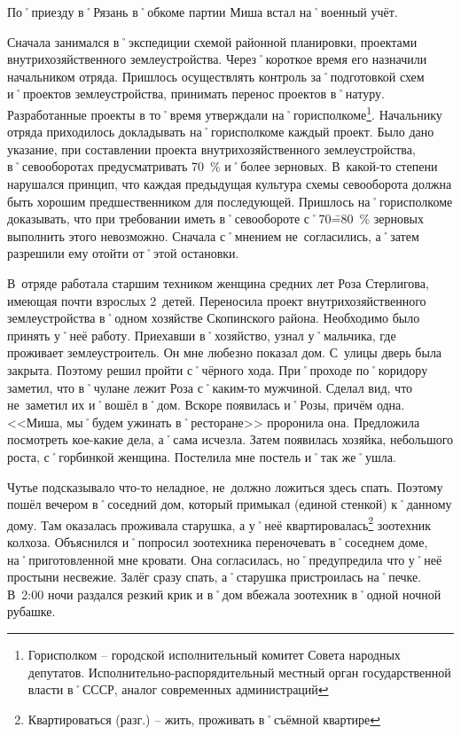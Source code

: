 По˚приезду в˚Рязань в˚обкоме партии Миша встал на˚военный учёт.

Сначала занимался в˚экспедиции схемой районной планировки, проектами внутрихозяйственного землеустройства. Через˚короткое время его назначили начальником отряда. Пришлось осуществлять контроль за˚подготовкой схем и˚проектов землеустройства, принимать перенос проектов в˚натуру. Разработанные проекты в то˚время утверждали на˚горисполкоме\footnote{Горисполком \--- городской исполнительный комитет Совета народных депутатов. Исполнительно-распорядительный местный орган государственной власти в˚СССР, аналог современных администраций}. Начальнику отряда приходилось докладывать на˚горисполкоме каждый проект. Было дано указание, при составлении проекта внутрихозяйственного землеустройства, в˚севооборотах предусматривать 70~\% и˚более зерновых. В~какой-то степени нарушался принцип, что каждая предыдущая культура схемы севооборота должна быть хорошим предшественником для последующей. Пришлось на˚горисполкоме доказывать, что при требовании иметь в˚севообороте с˚70\==80~\% зерновых выполнить этого невозможно. Сначала с˚мнением не~согласились, а˚затем разрешили ему отойти от˚этой остановки.

В~отряде работала старшим техником женщина средних лет Роза Стерлигова, имеющая почти взрослых 2~детей. Переносила проект внутрихозяйственного землеустройства в˚одном хозяйстве Скопинского района. Необходимо было принять у˚неё работу. Приехавши в˚хозяйство, узнал у˚мальчика, где проживает землеустроитель. Он мне любезно показал дом. С~улицы дверь была закрыта. Поэтому решил пройти с˚чёрного хода. При˚проходе по˚коридору заметил, что в˚чулане лежит Роза с˚каким-то мужчиной. Сделал вид, что не~заметил их и˚вошёл в˚дом. Вскоре появилась и˚Розы, причём одна. <<Миша, мы˚будем ужинать в˚ресторане>> проронила она. Предложила посмотреть кое-какие дела, а˚сама исчезла. Затем появилась хозяйка, небольшого роста, с˚горбинкой женщина. Постелила мне постель и˚так же˚ушла. 

Чутье подсказывало что-то неладное, не~должно ложиться здесь спать. Поэтому пошёл вечером в˚соседний дом, который примыкал (единой стенкой) к˚данному дому. Там оказалась проживала старушка, а у˚неё квартировалась\footnote{Квартироваться (разг.) \--- жить, проживать в˚съёмной квартире} зоотехник колхоза. Объяснился и˚попросил зоотехника переночевать в˚соседнем доме, на˚приготовленной мне кровати. Она согласилась, но˚предупредила что у˚неё простыни несвежие. Залёг сразу спать, а˚старушка пристроилась на˚печке. В~2:00 ночи раздался резкий крик и в˚дом вбежала зоотехник в˚одной ночной рубашке. 

